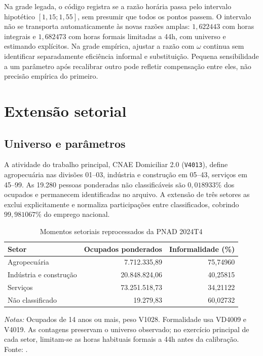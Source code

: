 Na grade legada, o código registra se a razão horária passa pelo intervalo hipotético $[1{,}15;1{,}55]$, sem presumir que todos os pontos passem. O intervalo não se transporta automaticamente às novas razões amplas: $1{,}622443$ com horas integrais e $1{,}682473$ com horas formais limitadas a 44h, com universo e estimando explícitos. Na grade empírica, ajustar a razão com $\omega$ continua sem identificar separadamente eficiência informal e substituição. Pequena sensibilidade a um parâmetro após recalibrar outro pode refletir compensação entre eles, não precisão empírica do primeiro.

\FloatBarrier
\section{Extensão setorial}\label{app:sectoral}
\subsection{Universo e parâmetros}
A atividade do trabalho principal, CNAE Domiciliar 2.0 (\texttt{V4013}), define agropecuária nas divisões 01--03, indústria e construção em 05--43, serviços em 45--99. As 19.280 pessoas ponderadas não classificáveis são $0{,}018933\%$ dos ocupados e permanecem identificadas no arquivo. A extensão de três setores as exclui explicitamente e normaliza participações entre classificados, cobrindo $99{,}981067\%$ do emprego nacional.
\begin{table}[htbp]
\centering
\caption{Momentos setoriais reprocessados da PNAD 2024T4}
\label{tab:sectoral_params}
\normalsize
\begin{tabular}{@{}lrr@{}}
\toprule
Setor & Ocupados ponderados & Informalidade (\%) \\
\midrule
Agropecuária & 7.712.335,89 & 75,74960 \\
Indústria e construção & 20.848.824,06 & 40,25815 \\
Serviços & 73.251.518,73 & 34,21122 \\
Não classificado & 19.279,83 & 60,02732 \\
\bottomrule
\end{tabular}
\begin{minipage}{0.95\textwidth}\normalsize
\textit{Notas:} Ocupados de 14 anos ou mais, peso V1028. Formalidade usa VD4009 e V4019. As contagens preservam o universo observado; no exercício principal de cada setor, limitam-se as horas habituais formais a 44h antes da calibração. Fonte: \citet{PNAD2024T4Microdados}.
\end{minipage}
\end{table}

